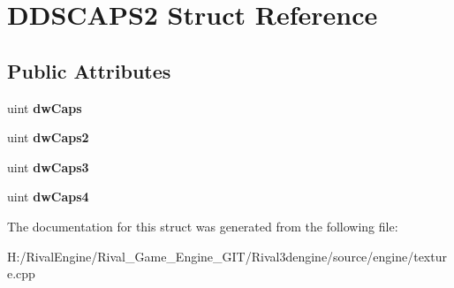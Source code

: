 \hypertarget{struct_d_d_s_c_a_p_s2}{}\section{D\+D\+S\+C\+A\+P\+S2 Struct Reference}
\label{struct_d_d_s_c_a_p_s2}
\subsection*{Public Attributes}
\begin{DoxyCompactItemize}
\item 
\mbox{\label{struct_d_d_s_c_a_p_s2_aeeaa6e011753f9456d765e31412efc1b}} 
uint {\bfseries dw\+Caps}
\item 
\mbox{\label{struct_d_d_s_c_a_p_s2_afe77b601d123fb9584011c8b9f05050b}} 
uint {\bfseries dw\+Caps2}
\item 
\mbox{\label{struct_d_d_s_c_a_p_s2_a0753215c432c8c49ffff942388f9b877}} 
uint {\bfseries dw\+Caps3}
\item 
\mbox{\label{struct_d_d_s_c_a_p_s2_a7068a2bec849d63e86fc4184185afaf2}} 
uint {\bfseries dw\+Caps4}
\end{DoxyCompactItemize}


The documentation for this struct was generated from the following file\+:\begin{DoxyCompactItemize}
\item 
H\+:/\+Rival\+Engine/\+Rival\+\_\+\+Game\+\_\+\+Engine\+\_\+\+G\+I\+T/\+Rival3dengine/source/engine/texture.\+cpp\end{DoxyCompactItemize}
